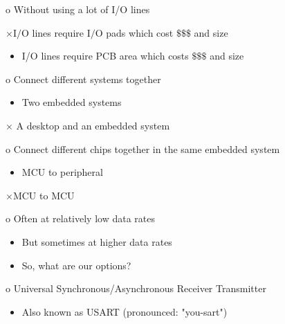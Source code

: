 \documentclass[10pt]{article}
\begin{document}
o Without using a lot of I/O lines

$\times \mathrm{I} / \mathrm{O}$ lines require $\mathrm{I} / \mathrm{O}$ pads which cost $\$ \$ \$$ and size

\begin{itemize}
  \item I/O lines require PCB area which costs $\$ \$ \$$ and size
\end{itemize}

o Connect different systems together

\begin{itemize}
  \item Two embedded systems
\end{itemize}

$\times$ A desktop and an embedded system

o Connect different chips together in the same embedded system

\begin{itemize}
  \item MCU to peripheral
\end{itemize}

$\times \mathrm{MCU}$ to $\mathrm{MCU}$

o Often at relatively low data rates

\begin{itemize}
  \item But sometimes at higher data rates

  \item So, what are our options?

\end{itemize}

o Universal Synchronous/Asynchronous Receiver Transmitter

\begin{itemize}
  \item Also known as USART (pronounced: "you-sart")
\end{itemize}
\end{document}
